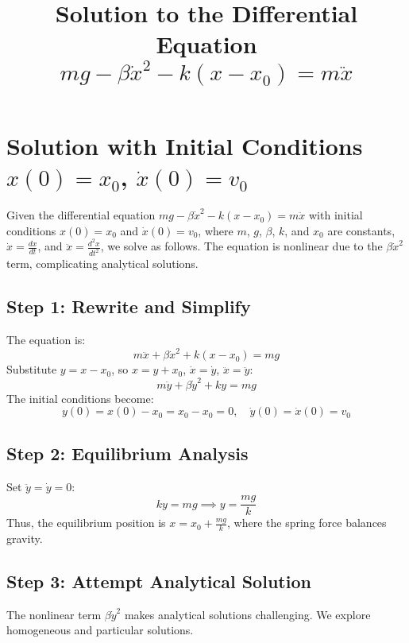 \documentclass[a4paper,12pt]{article}
\begin{document}
\title{Solution to the Differential Equation \(mg - \beta \dot{x}^2 - k(x - x_0) = m \ddot{x}\)}
\author{}
\date{}
\maketitle

\section*{Solution with Initial Conditions \(x(0) = x_0\), \(\dot{x}(0) = v_0\)}

Given the differential equation \(mg - \beta \dot{x}^2 - k(x - x_0) = m \ddot{x}\) with initial conditions \(x(0) = x_0\) and \(\dot{x}(0) = v_0\), where \(m\), \(g\), \(\beta\), \(k\), and \(x_0\) are constants, \(\dot{x} = \frac{dx}{dt}\), and \(\ddot{x} = \frac{d^2x}{dt^2}\), we solve as follows. The equation is nonlinear due to the \(\beta \dot{x}^2\) term, complicating analytical solutions.

\subsection*{Step 1: Rewrite and Simplify}
The equation is:
\begin{equation}
m \ddot{x} + \beta \dot{x}^2 + k(x - x_0) = mg
\end{equation}
Substitute \(y = x - x_0\), so \(x = y + x_0\), \(\dot{x} = \dot{y}\), \(\ddot{x} = \ddot{y}\):
\begin{equation}
m \ddot{y} + \beta \dot{y}^2 + k y = mg
\end{equation}
The initial conditions become:
\[
y(0) = x(0) - x_0 = x_0 - x_0 = 0, \quad \dot{y}(0) = \dot{x}(0) = v_0
\]

\subsection*{Step 2: Equilibrium Analysis}
Set \(\ddot{y} = \dot{y} = 0\):
\[
k y = mg \implies y = \frac{mg}{k}
\]
Thus, the equilibrium position is \(x = x_0 + \frac{mg}{k}\), where the spring force balances gravity.

\subsection*{Step 3: Attempt Analytical Solution}
The nonlinear term \(\beta \dot{y}^2\) makes analytical solutions challenging. We explore homogeneous and particular solutions.
\end{document}
